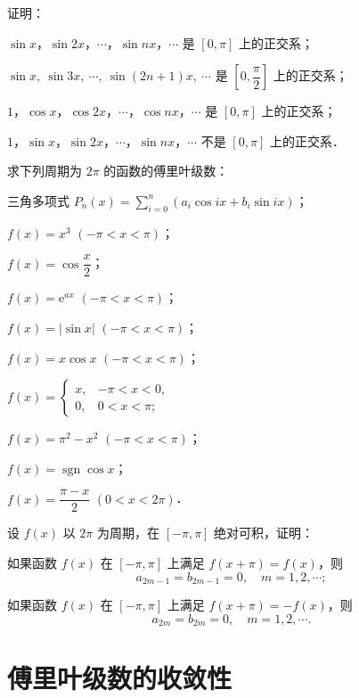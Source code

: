 \begin{xiti}
\item 证明：
\begin{ziti}
\item $\sin x$，$\sin 2x$，$\cdots$，$\sin nx$，$\cdots$ 是 $[0,\pi]$ 上的正交系；
\item $\sin x,\ \sin 3x,\ \cdots,\ \sin(2n+1)x,\ \cdots$ 是 $\left[0,\dfrac{\pi}{2}\right]$ 上的正交系；
\item $1$，$\cos x$，$\cos 2x$，$\cdots$，$\cos nx$，$\cdots$ 是 $[0,\pi]$ 上的正交系；
\item $1$，$\sin x$，$\sin 2x$，$\cdots$，$\sin nx$，$\cdots$ 不是 $[0,\pi]$ 上的正交系．
\end{ziti}
\item 求下列周期为 $2\pi$ 的函数的傅里叶级数：
\begin{ziti}
\item 三角多项式 $\displaystyle P_{n}(x)=\sum_{i=0}^{n}\left(a_{i}\cos ix+b_{i}\sin ix\right)$；
\item $f(x)=x^{3}$ $(-\pi<x<\pi)$；
\item $f(x)=\cos\dfrac{x}{2}$；
\item $f(x)=\mathrm{e}^{ax}$ $(-\pi<x<\pi)$；
\item $f(x)=\left|\sin x\right|$ $(-\pi<x<\pi)$；
\item $f(x)=x\cos x$ $(-\pi<x<\pi)$；
\item $f(x)=\begin{cases}x,&-\pi<x<0,\\ 0,&0<x<\pi;\end{cases}$
\item $f(x)=\pi^{2}-x^{2}$ $(-\pi<x<\pi)$；
\item $f(x)=\operatorname{sgn}\cos x$；
\item $f(x)=\dfrac{\pi-x}{2}$ $(0<x<2\pi)$．
\end{ziti}
\item 设 $f(x)$ 以 $2\pi$ 为周期，在 $[-\pi,\pi]$ 绝对可积，证明：
\begin{ziti}
\item 如果函数 $f(x)$ 在 $[-\pi,\pi]$ 上满足 $f(x+\pi)=f(x)$，则
\[
a_{2m-1}=b_{2m-1}=0,\quad m=1,2,\cdots;
\]
\item 如果函数 $f(x)$ 在 $[-\pi,\pi]$ 上满足 $f(x+\pi)=-f(x)$，则
\[
a_{2m}=b_{2m}=0,\quad m=1,2,\cdots.
\]
\end{ziti}
\end{xiti}

\section{傅里叶级数的收敛性}

